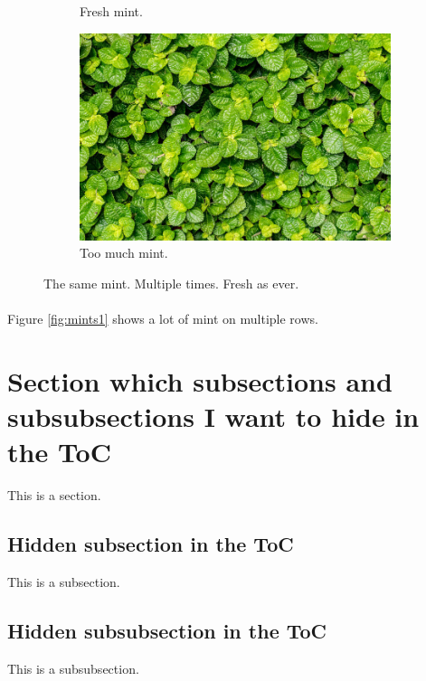 \documentclass{book}
\begin{document}
\begin{figure}[h!]
\begin{subfigure}[b]{0.2\linewidth}
    \caption{Fresh mint.}
  \end{subfigure}
  \begin{subfigure}[b]{0.5\linewidth}
    \includegraphics[width=\linewidth]{mint.jpg}
    \caption{Too much mint.}
  \end{subfigure}
  \caption{The same mint. Multiple times. Fresh as ever.}
  \label{fig:mints2}
\end{figure}

\paragraph{} 

Figure \ref{fig:mints1} shows a lot of mint on multiple rows.

\section{Section which subsections and subsubsections I want to hide in the ToC}

This is a section.

\subsection{Hidden subsection in the ToC}

This is a subsection.

\subsection{Hidden subsubsection in the ToC}

This is a subsubsection.
\end{document}

